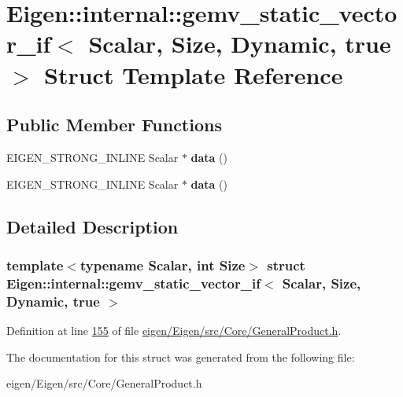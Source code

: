 \hypertarget{struct_eigen_1_1internal_1_1gemv__static__vector__if_3_01_scalar_00_01_size_00_01_dynamic_00_01true_01_4}{}\section{Eigen\+:\+:internal\+:\+:gemv\+\_\+static\+\_\+vector\+\_\+if$<$ Scalar, Size, Dynamic, true $>$ Struct Template Reference}
\label{struct_eigen_1_1internal_1_1gemv__static__vector__if_3_01_scalar_00_01_size_00_01_dynamic_00_01true_01_4}
\subsection*{Public Member Functions}
\begin{DoxyCompactItemize}
\item 
\mbox{\label{struct_eigen_1_1internal_1_1gemv__static__vector__if_3_01_scalar_00_01_size_00_01_dynamic_00_01true_01_4_a70bb966a3697166cc95904af768d23fd}} 
E\+I\+G\+E\+N\+\_\+\+S\+T\+R\+O\+N\+G\+\_\+\+I\+N\+L\+I\+NE Scalar $\ast$ {\bfseries data} ()
\item 
\mbox{\label{struct_eigen_1_1internal_1_1gemv__static__vector__if_3_01_scalar_00_01_size_00_01_dynamic_00_01true_01_4_a70bb966a3697166cc95904af768d23fd}} 
E\+I\+G\+E\+N\+\_\+\+S\+T\+R\+O\+N\+G\+\_\+\+I\+N\+L\+I\+NE Scalar $\ast$ {\bfseries data} ()
\end{DoxyCompactItemize}


\subsection{Detailed Description}
\subsubsection*{template$<$typename Scalar, int Size$>$\newline
struct Eigen\+::internal\+::gemv\+\_\+static\+\_\+vector\+\_\+if$<$ Scalar, Size, Dynamic, true $>$}



Definition at line \hyperlink{eigen_2_eigen_2src_2_core_2_general_product_8h_source_l00155}{155} of file \hyperlink{eigen_2_eigen_2src_2_core_2_general_product_8h_source}{eigen/\+Eigen/src/\+Core/\+General\+Product.\+h}.



The documentation for this struct was generated from the following file\+:\begin{DoxyCompactItemize}
\item 
eigen/\+Eigen/src/\+Core/\+General\+Product.\+h\end{DoxyCompactItemize}
